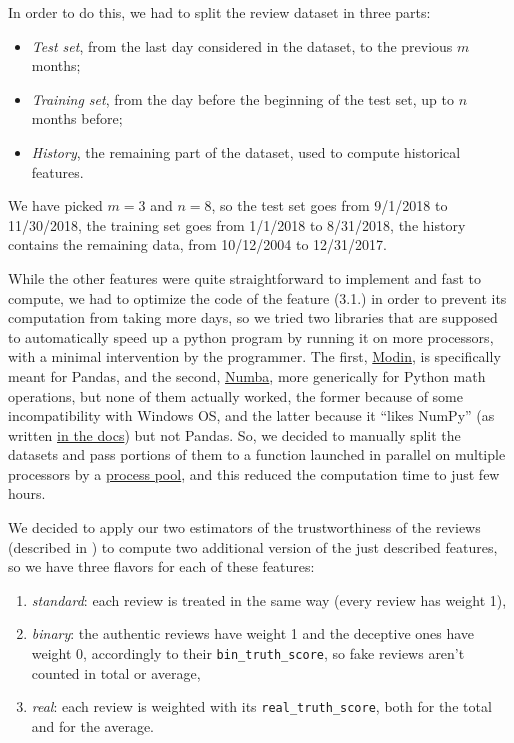 In order to do this, we had to split the review dataset in three parts:
\begin{itemize}
	\item \textit{Test set}, from the last day considered in the dataset, to the previous $m$ months;
	\item \textit{Training set}, from the day before the beginning of the test set, up to $n$ months before;
	\item \textit{History}, the remaining part of the dataset, used to compute historical features.
\end{itemize}
We have picked $m=3$ and $n=8$, so the test set goes from 9/1/2018 to 11/30/2018, the training set goes from 1/1/2018 to 8/31/2018, the history contains the remaining data, from 10/12/2004 to 12/31/2017.

While the other features were quite straightforward to implement and fast to compute, we had to optimize the code of the feature (3.1.) in order to prevent its computation from taking more days, so we tried two libraries that are supposed to automatically speed up a python program by running it on more processors, with a minimal intervention by the programmer. The first, \href{https://modin.readthedocs.io/en/latest/index.html}{Modin}, is specifically meant for Pandas, and the second, \href{https://numba.pydata.org/}{Numba}, more generically for Python math operations, but none of them actually worked, the former because of some incompatibility with Windows OS, and the latter because it ``likes NumPy'' (as written \href{http://numba.pydata.org/numba-doc/latest/user/5minguide.html#will-numba-work-for-my-code}{in the docs}) but not Pandas. So, we decided to manually split the datasets and pass portions of them to a function launched in parallel on multiple processors by a \href{https://docs.python.org/3.6/library/multiprocessing.html#module-multiprocessing.pool}{process pool}, and this reduced the computation time to just few hours.

We decided to apply our two estimators of the trustworthiness of the reviews (described in ) to compute two additional version of the just described features, so we have three flavors for each of these features:
\begin{enumerate}
	\item \textit{standard}: each review is treated in the same way (every review has weight 1),
	\item \textit{binary}: the authentic reviews have weight 1 and the deceptive ones have weight 0, accordingly to their \texttt{bin\_truth\_score}, so fake reviews aren't counted in total or average,
	\item \textit{real}: each review is weighted with its \texttt{real\_truth\_score}, both for the total and for the average.
\end{enumerate}


